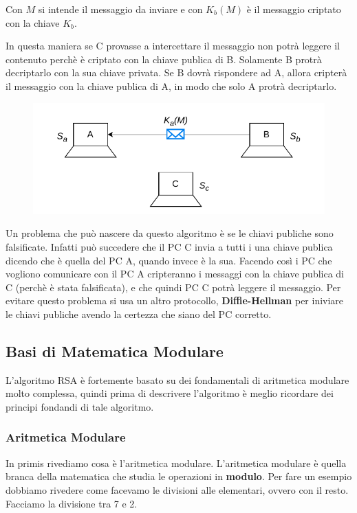 \documentclass{rapport}
\begin{document}
Con $M$ si intende il messaggio da inviare e con $K_b(M)$ è il messaggio criptato con la chiave $K_b$. 

In questa maniera se C provasse a intercettare il messaggio non potrà leggere il contenuto perchè è criptato con la chiave publica di B. Solamente B protrà decriptarlo con la sua chiave privata. Se B dovrà rispondere ad A, allora cripterà il messaggio con la chiave publica di A, in modo che solo A protrà decriptarlo. 


\begin{figure} [h]
    \centering
    \includegraphics[width=0.7\linewidth]{logos/crit4.pdf}
\end{figure}


Un problema che può nascere da questo algoritmo è se le chiavi publiche sono falsificate. Infatti può succedere che il PC C invia a tutti i una chiave publica dicendo che è quella del PC A, quando invece è la sua. Facendo così i PC che vogliono comunicare con il PC A cripteranno i messaggi con la chiave publica di C (perchè è stata falsificata), e che quindi PC C potrà leggere il messaggio. Per evitare questo problema si usa un altro protocollo, \textbf{Diffie-Hellman} per iniviare le chiavi publiche avendo la certezza che siano del PC corretto.

\newpage
\subsection{Basi di Matematica Modulare}
L'algoritmo RSA è fortemente basato su dei fondamentali di aritmetica modulare molto complessa, quindi prima di descrivere l'algoritmo è meglio ricordare dei principi fondandi di tale algoritmo.

\subsubsection{Aritmetica Modulare}
In primis rivediamo cosa è l'aritmetica modulare. L'aritmetica modulare è quella branca della matematica che studia le operazioni in \textbf{modulo}. Per fare un esempio dobbiamo rivedere come facevamo le divisioni alle elementari, ovvero con il resto. Facciamo la divisione tra 7 e 2.
\end{document}
